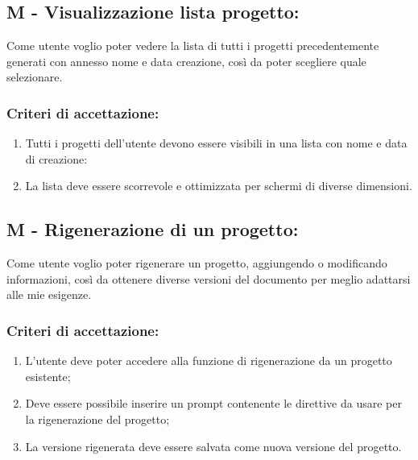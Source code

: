 \vspace{0.5cm}

\subsection*{M - Visualizzazione lista progetto:}

\noindent Come utente voglio poter vedere la lista di tutti i progetti precedentemente generati con annesso nome e data creazione, così da poter scegliere quale selezionare. 

\subsubsection*{Criteri di accettazione:}

\begin{enumerate}
    \item Tutti i progetti dell'utente devono essere visibili in una lista con nome e data di creazione:
    \item La lista deve essere scorrevole e ottimizzata per schermi di diverse dimensioni.
\end{enumerate}

\vspace{0.5cm}

\subsection*{M - Rigenerazione di un progetto:}

\noindent Come utente voglio poter rigenerare un progetto, aggiungendo o modificando informazioni, così da ottenere diverse versioni del documento per meglio adattarsi alle mie esigenze.

\subsubsection*{Criteri di accettazione:}

\begin{enumerate}
    \item L'utente deve poter accedere alla funzione di rigenerazione da un progetto esistente;
    \item Deve essere possibile inserire un \gls{prompt} contenente le direttive da usare per la rigenerazione del progetto;
    \item La versione rigenerata deve essere salvata come nuova versione del progetto.
\end{enumerate}


